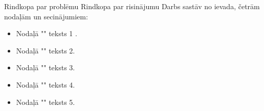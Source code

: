 Rindkopa par problēmu
Rindkopa par risinājumu
Darbs sastāv no ievada, četrām nodaļām un secinājumiem:
\begin{itemize}
    \item Nodaļā "{\@nodone}" teksts 1 .
    \item Nodaļā "{\@nodtwo}" teksts 2. 
    \item Nodaļā "{\@nodthree}" teksts 3.
    \item Nodaļā "{\@nodfour}" teksts 4.
    \item Nodaļā "{\@nodsix}" teksts 5.
\end{itemize} 